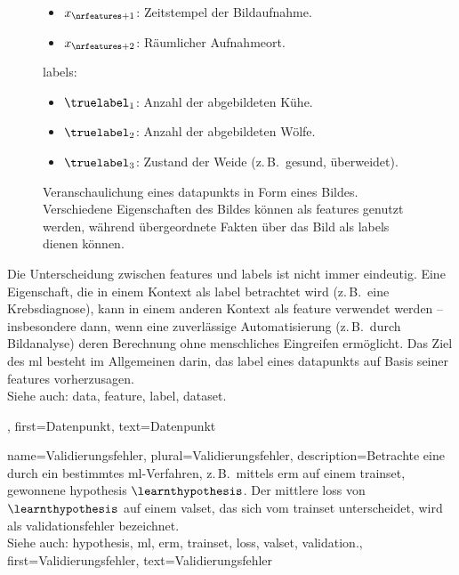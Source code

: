 {{{{{{\begin{figure}[H]
\begin{minipage}[t]{0.95\textwidth}
\begin{itemize}
            			\item $x_{\nrfeatures+1}$: Zeitstempel der Bildaufnahme.
            			\item $x_{\nrfeatures+2}$: Räumlicher Aufnahmeort.
			\end{itemize}
			\Glspl{label}:
            		\begin{itemize}
               	 		\item $\truelabel_{1}$: Anzahl der abgebildeten Kühe. 
                			\item $\truelabel_{2}$: Anzahl der abgebildeten Wölfe. 
                			\item $\truelabel_{3}$: Zustand der Weide (z.\,B.\ gesund, überweidet).
            		\end{itemize}
    			\end{minipage}
    			\caption{Veranschaulichung eines \gls{data}punkts in Form eines Bildes. 
				Verschiedene Eigenschaften des Bildes können als \glspl{feature} 
				genutzt werden, während übergeordnete Fakten über das Bild als 
				\glspl{label} dienen können.\label{fig:datapoint_cowherd_dict}}
		\end{figure}
 		Die Unterscheidung zwischen \glspl{feature} und \glspl{label} ist nicht immer eindeutig. 
 		Eine Eigenschaft, die in einem Kontext als \gls{label} betrachtet wird (z.\,B.\ eine Krebsdiagnose), 
 		kann in einem anderen Kontext als \gls{feature} verwendet werden – insbesondere dann, wenn eine 
 		zuverlässige Automatisierung (z.\,B.\ durch Bildanalyse) deren Berechnung ohne menschliches 
		Eingreifen ermöglicht.
   		Das Ziel des \gls{ml} besteht im Allgemeinen darin, das \gls{label} eines \gls{data}punkts 
		auf Basis seiner \glspl{feature} vorherzusagen.\\
		Siehe auch: \gls{data}, \gls{feature}, \gls{label}, \gls{dataset}.}, 
	first={Datenpunkt},
	text={Datenpunkt}  
}


{name={Validierungsfehler}, plural={Validierungsfehler},
 	description={Betrachte eine durch ein bestimmtes 
 		\gls{ml}-Verfahren, z.\,B.\ mittels \gls{erm} auf einem \gls{trainset}, 
 		gewonnene \gls{hypothesis} $\learnthypothesis$. 
 		Der mittlere \gls{loss} von $\learnthypothesis$ auf einem \gls{valset}, 
 		das sich vom \gls{trainset} unterscheidet, wird als \gls{validation}sfehler bezeichnet.
			\\
		Siehe auch: \gls{hypothesis}, \gls{ml}, \gls{erm}, \gls{trainset}, \gls{loss}, \gls{valset}, \gls{validation}.},
	first={Validierungsfehler},
	text={Validierungsfehler}  
}


}}}}
